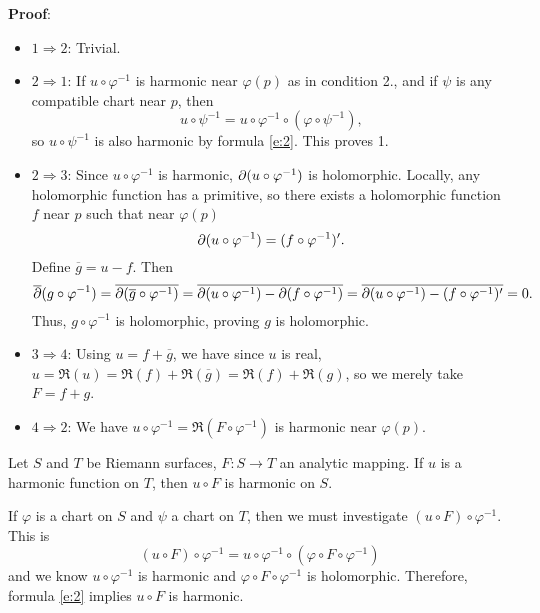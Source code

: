 \documentclass[a4paper,11pt]{article}
\begin{document}
\begin{mdframed}
  \textbf{Proof}:
  \begin{itemize}
  \item $1 \Rightarrow 2$: Trivial.
  \item $2 \Rightarrow 1$: If $u \circ \varphi^{-1}$ is harmonic near
    $\varphi(p)$ as in condition 2., and if $\psi$ is any compatible
    chart near $p$, then
    $$
    u \circ \psi^{-1} = u\circ \varphi^{-1} \circ (\varphi \circ
    \psi^{-1}),
    $$
    so $u \circ \psi^{-1}$ is also harmonic by formula
    \eqref{e:2}. This proves 1.
  \item $2\Rightarrow 3$: Since $u \circ \varphi^{-1}$ is harmonic,
    $\partial (u \circ \varphi^{-1})$ is holomorphic.  Locally, any
    holomorphic function has a primitive, so there exists a
    holomorphic function $f$ near $p$ such that near $\varphi(p)$
    $$
    \partial(u\circ \varphi^{-1}) = (f \circ \varphi^{-1})'.
    $$
    Define $\overline{g} = u - f$.  Then
    $$
    \overline{\partial}(g \circ \varphi^{-1})
    = \overline{\partial(\overline{g} \circ \varphi^{-1})}
    = \overline{\partial(u\circ \varphi^{-1}) - \partial(f\circ \varphi^{-1})}
    = \overline{\partial(u\circ \varphi^{-1}) - (f\circ \varphi^{-1})'}
    = 0.
    $$
    Thus, $g \circ \varphi^{-1}$ is holomorphic, proving $g$ is
    holomorphic.
  \item $3 \Rightarrow 4$: Using $u = f + \overline{g}$, we have since
    $u$ is real, $u = \Re(u) = \Re(f) + \Re(\overline{g}) = \Re(f) +
    \Re(g)$, so we merely take $F = f+g$.
  \item $4 \Rightarrow 2$: We have $u \circ \varphi^{-1} = \Re(F \circ
    \varphi^{-1})$ is harmonic near $\varphi(p)$.
  \end{itemize}
\end{mdframed}

\begin{propn}
  \label{propn:2}
  Let $S$ and $T$ be Riemann surfaces, $F : S \to T$ an analytic
  mapping.  If $u$ is a harmonic function on $T$, then $u \circ F$ is
  harmonic on $S$.
\end{propn}

\begin{myproof}
  If $\varphi$ is a chart on $S$ and $\psi$ a chart on $T$, then we
  must investigate $(u\circ F) \circ \varphi^{-1}$.  This is
  $$
  (u \circ F)\circ \varphi^{-1} 
  = u \circ \varphi^{-1} \circ (\varphi \circ F \circ \varphi^{-1})
  $$
  and we know $u \circ \varphi^{-1}$ is harmonic and $\varphi \circ F
  \circ \varphi^{-1}$ is holomorphic. Therefore, formula \eqref{e:2}
  implies $u \circ F$ is harmonic.
\end{myproof}
\end{document}
